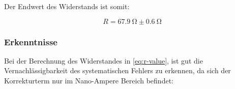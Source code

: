 Der Endwert des Widerstands ist somit: 

\[
    R = \SI{67.9}{\ohm} \pm \SI{0.6}{\ohm}
\]

\subsubsection{Erkenntnisse}

Bei der Berechnung des Widerstandes in \autoref{eq:r-value}, ist gut die Vernachlässigbarkeit des
systematischen Fehlers zu erkennen, da sich der Korrekturterm nur im
Nano-Ampere Bereich befindet: